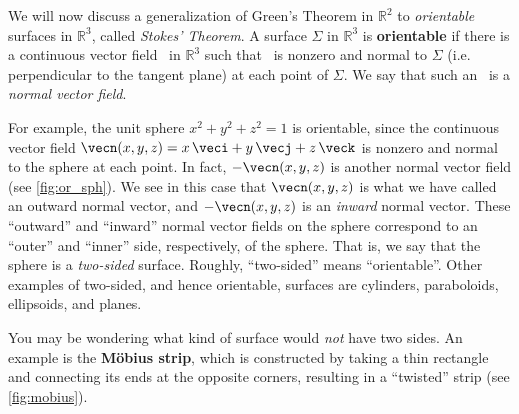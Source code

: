 We will now discuss a generalization of Green's Theorem in $\mathbb{R}^{2}$ to \emph{orientable} surfaces in $\mathbb{R}^{3}$, called \emph{Stokes' Theorem}. A surface $\Sigma$ in $\mathbb{R}^{3}$ is \textbf{orientable} if there is a continuous vector field \vecn\ in $\mathbb{R}^{3}$ such that \vecn\ is nonzero and normal to $\Sigma$ (i.e. perpendicular to the tangent plane) at each point of $\Sigma$. We say that such an \vecn\ is a \emph{normal vector field}.


For example, the unit sphere $x^2 + y^2 + z^2 = 1$ is orientable, since the continuous vector field $\vecn(x,y,z) = x\,\veci + y\,\vecj + z\,\veck$ is nonzero and normal to the sphere at each point. In fact, $-\vecn(x,y,z)$ is another normal vector field (see \autoref{fig:or_sph}). We see in this case that $\vecn(x,y,z)$ is what we have called an outward normal vector, and $-\vecn(x,y,z)$ is an \emph{inward} normal vector. These ``outward'' and ``inward'' normal vector fields on the sphere correspond to an ``outer'' and ``inner'' side, respectively, of the sphere. That is, we say that the sphere is a \emph{two-sided} surface. Roughly, ``two-sided'' means ``orientable''. Other examples of two-sided, and hence orientable, surfaces are cylinders, paraboloids, ellipsoids, and planes.

You may be wondering what kind of surface would \emph{not} have two sides. An example is the \textbf{M\"{o}bius strip}, which is constructed by taking a thin rectangle and connecting its ends at the opposite corners, resulting in a ``twisted'' strip (see \autoref{fig:mobius}).

